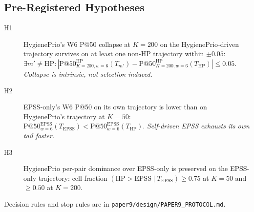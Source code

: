 \subsection{Pre-Registered Hypotheses}

\begin{description}
\item[H1] HygienePrio's W6 P@50 collapse at $K = 200$ on the
HygienePrio-driven trajectory survives on at least one non-HP trajectory
within $\pm 0.05$: $\exists m' \neq \mathrm{HP}: |\mathrm{P@50}^{\mathrm{HP}}_{K=200, w=6}(T_{m'}) -
\mathrm{P@50}^{\mathrm{HP}}_{K=200, w=6}(T_{\mathrm{HP}})| \leq 0.05$.
\textit{Collapse is intrinsic, not selection-induced.}
\item[H2] EPSS-only's W6 P@50 on its own trajectory is lower than on
HygienePrio's trajectory at $K = 50$:
$\mathrm{P@50}^{\mathrm{EPSS}}_{w=6}(T_{\mathrm{EPSS}}) <
\mathrm{P@50}^{\mathrm{EPSS}}_{w=6}(T_{\mathrm{HP}})$.
\textit{Self-driven EPSS exhausts its own tail faster.}
\item[H3] HygienePrio per-pair dominance over EPSS-only is preserved
on the EPSS-only trajectory: cell-fraction $(\mathrm{HP} > \mathrm{EPSS}
\mid T_{\mathrm{EPSS}}) \geq 0.75$ at $K = 50$ and $\geq 0.50$ at $K = 200$.
\end{description}

Decision rules and stop rules are in
\texttt{paper9/design/PAPER9\_PROTOCOL.md}.
